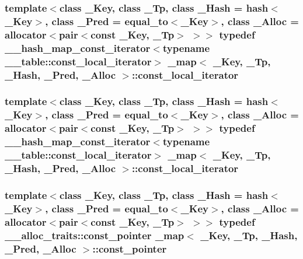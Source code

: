 \subsubsection[{const\+\_\+local\+\_\+iterator}]{\setlength{\rightskip}{0pt plus 5cm}template$<$class \+\_\+\+Key, class \+\_\+\+Tp, class \+\_\+\+Hash = hash$<$\+\_\+\+Key$>$, class \+\_\+\+Pred = equal\+\_\+to$<$\+\_\+\+Key$>$, class \+\_\+\+Alloc = allocator$<$pair$<$const \+\_\+\+Key, \+\_\+\+Tp$>$ $>$$>$ typedef {\bf \+\_\+\+\_\+hash\+\_\+map\+\_\+const\+\_\+iterator}$<$typename \+\_\+\+\_\+table\+::const\+\_\+local\+\_\+iterator$>$ {\bf \+\_\+map}$<$ \+\_\+\+Key, \+\_\+\+Tp, \+\_\+\+Hash, \+\_\+\+Pred, \+\_\+\+Alloc $>$\+::{\bf const\+\_\+local\+\_\+iterator}}\label{class__map_aa447944b5b72b05cb3d909f7ac48d2d7}
\hypertarget{class__map_aa447944b5b72b05cb3d909f7ac48d2d7}{}
\subsubsection[{const\+\_\+local\+\_\+iterator}]{\setlength{\rightskip}{0pt plus 5cm}template$<$class \+\_\+\+Key, class \+\_\+\+Tp, class \+\_\+\+Hash = hash$<$\+\_\+\+Key$>$, class \+\_\+\+Pred = equal\+\_\+to$<$\+\_\+\+Key$>$, class \+\_\+\+Alloc = allocator$<$pair$<$const \+\_\+\+Key, \+\_\+\+Tp$>$ $>$$>$ typedef {\bf \+\_\+\+\_\+hash\+\_\+map\+\_\+const\+\_\+iterator}$<$typename \+\_\+\+\_\+table\+::const\+\_\+local\+\_\+iterator$>$ {\bf \+\_\+map}$<$ \+\_\+\+Key, \+\_\+\+Tp, \+\_\+\+Hash, \+\_\+\+Pred, \+\_\+\+Alloc $>$\+::{\bf const\+\_\+local\+\_\+iterator}}\label{class__map_aa447944b5b72b05cb3d909f7ac48d2d7}
\hypertarget{class__map_a12b2f2762c9383a99c0caf9b2f3ec696}{}
\subsubsection[{const\+\_\+pointer}]{\setlength{\rightskip}{0pt plus 5cm}template$<$class \+\_\+\+Key, class \+\_\+\+Tp, class \+\_\+\+Hash = hash$<$\+\_\+\+Key$>$, class \+\_\+\+Pred = equal\+\_\+to$<$\+\_\+\+Key$>$, class \+\_\+\+Alloc = allocator$<$pair$<$const \+\_\+\+Key, \+\_\+\+Tp$>$ $>$$>$ typedef \+\_\+\+\_\+alloc\+\_\+traits\+::const\+\_\+pointer {\bf \+\_\+map}$<$ \+\_\+\+Key, \+\_\+\+Tp, \+\_\+\+Hash, \+\_\+\+Pred, \+\_\+\+Alloc $>$\+::{\bf const\+\_\+pointer}}\label{class__map_a12b2f2762c9383a99c0caf9b2f3ec696}
\hypertarget{class__map_a12b2f2762c9383a99c0caf9b2f3ec696}{}
